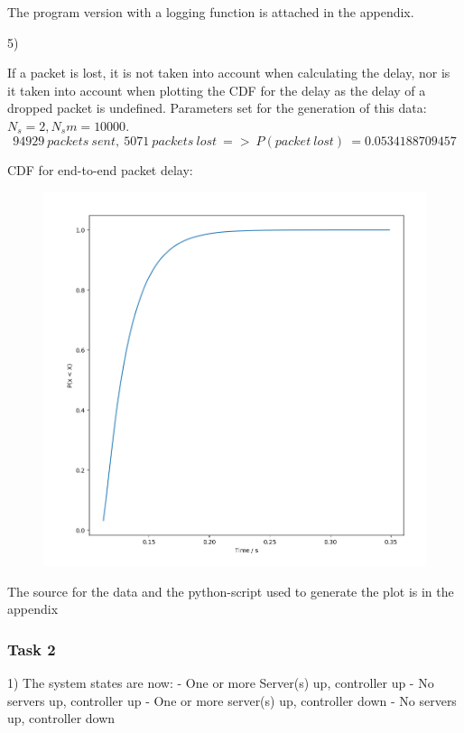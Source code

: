 \documentclass[11pt]{article}
\begin{document}
The program version with a logging function is attached in the appendix.

5)

If a packet is lost, it is not taken into account when calculating the delay, nor is it taken into account when plotting the CDF for the delay as the delay of a dropped packet is undefined.
Parameters set for the generation of this data: $N_s = 2, N_sm = 10000$.
$$94929\ packets\ sent,\ 5071\ packets\ lost\ =>\ P(packet\ lost)\ = 0.0534188709457$$

CDF for end-to-end packet delay:

\begin{figure}
	\includegraphics[width=\textwidth]{cdf_plot.png}
	\centering
\end{figure}

The source for the data and the python-script used to generate the plot is in the appendix

\newpage

\subsubsection{Task 2}

1) The system states are now:
- One or more Server(s) up, controller up
- No servers up, controller up
- One or more server(s) up, controller down
- No servers up, controller down
\end{document}
